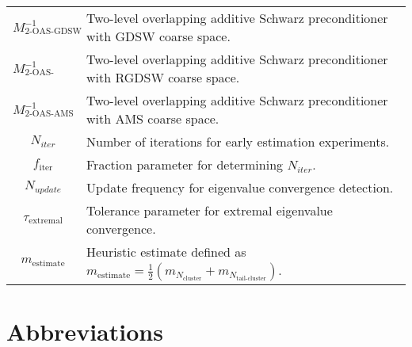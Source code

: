 \begin{longtable}{c p{10cm}}
    $M^{-1}_{\text{2-OAS-GDSW}}$                       & Two-level overlapping additive Schwarz preconditioner with GDSW coarse space.                                            \\
    $M^{-1}_{\text{2-OAS-RGDSW}}$                      & Two-level overlapping additive Schwarz preconditioner with RGDSW coarse space.                                           \\
    $M^{-1}_{\text{2-OAS-AMS}}$                        & Two-level overlapping additive Schwarz preconditioner with AMS coarse space.                                             \\
    $N_{iter}$                                         & Number of iterations for early estimation experiments.                                                                   \\
    $f_{\text{iter}}$                                  & Fraction parameter for determining $N_{iter}$.                                                                           \\
    $N_{update}$                                       & Update frequency for eigenvalue convergence detection.                                                                   \\
    $\tau_{\text{extremal}}$                           & Tolerance parameter for extremal eigenvalue convergence.                                                                 \\
    $m_{\text{estimate}}$                              & Heuristic estimate defined as $m_{\text{estimate}} = \frac{1}{2}(m_{N_{\text{cluster}}} + m_{N_{\text{tail-cluster}}})$. \\
\end{longtable}

\section*{Abbreviations}

